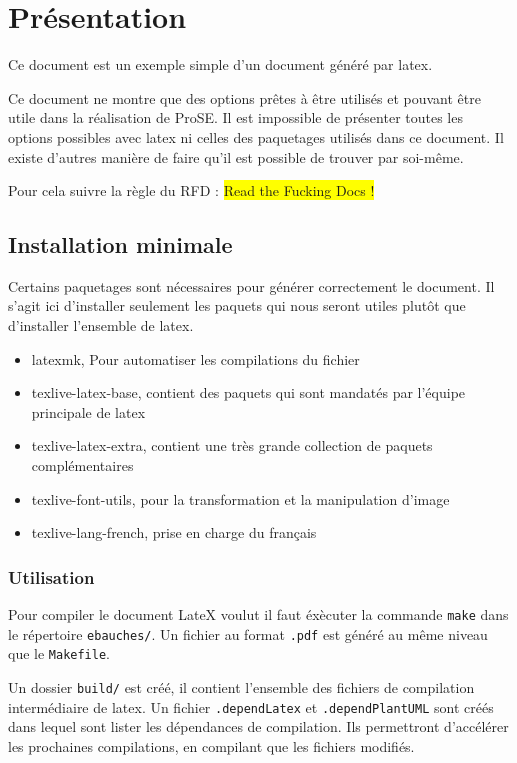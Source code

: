 \section{Présentation}
Ce document est un exemple simple d'un document généré par \gls{latex}. \newline

Ce document ne montre que des options prêtes à être utilisés et pouvant être utile dans la réalisation de ProSE.
Il est impossible de présenter toutes les options possibles avec \gls{latex} ni celles des paquetages utilisés
dans ce document.
Il existe d'autres manière de faire qu'il est possible de trouver par soi-même.

Pour cela suivre la règle du RFD : \colorbox{yellow}{Read the Fucking Docs !}

\subsection{Installation minimale}
Certains paquetages sont nécessaires pour générer correctement le document.
Il s'agit ici d'installer seulement les paquets qui nous seront utiles plutôt que d'installer l'ensemble de \gls{latex}.
\begin{itemize}
    \item latexmk, Pour automatiser les compilations du fichier
    \item texlive-latex-base, contient des paquets qui sont mandatés par l'équipe principale de \gls{latex}
    \item texlive-latex-extra, contient une très grande collection de paquets complémentaires
    \item texlive-font-utils, pour la transformation et la manipulation d'image
    \item texlive-lang-french, prise en charge du français
\end{itemize}

\subsubsection{Utilisation}
Pour compiler le document LateX voulut il faut éxècuter la commande \verb=make= dans le répertoire \verb=ebauches/=.
Un fichier au format \verb=.pdf= est généré au même niveau que le \verb=Makefile=. \newline

Un dossier \verb=build/= est créé, il contient l'ensemble des fichiers de compilation intermédiaire de \gls{latex}.
Un fichier \verb=.dependLatex= et \verb=.dependPlantUML= sont créés dans lequel sont lister les dépendances de compilation.
Ils permettront d'accélérer les prochaines compilations, en compilant que les fichiers modifiés.

